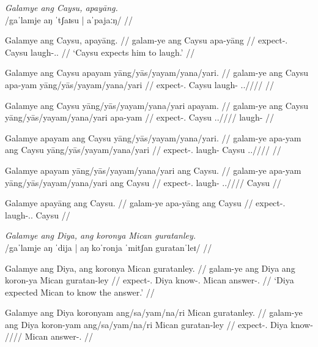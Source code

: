 \documentclass[12pt,a4paper]{scrartcl}
\newcommand{\PargI}{{\Parg}.{\Inan}}
\newcommand{\TsgM}{{\Tsg}.{\M}}
\newcommand{\TsgF}{{\Tsg}.{\F}}
\begin{document}
\xe

\pex
\a\begingl
\glpreamble \textit{Galamye ang Caysu, apayāng.} \\
	/gaˈlamje aŋ ˈtʃaɪsu | aˈpajaːŋ/ //

\gla Galamye ang Caysu, apayāng. //
\glb galam-ye ang Caysu apa-yāng //
\glc expect-\TsgF{} \Aarg{} Caysu laugh-\TsgM{}.\Aarg{} //
\glft `Caysu expects him to laugh.' //
\endgl

\a\ljudge*\begingl
\gla Galamye ang Caysu apayam yāng/yās/yayam/yana/yari. //
\glb galam-ye ang Caysu apa-yam yāng/yās/yayam/yana/yari //
\glc expect-\TsgF{} \Aarg{} Caysu laugh-\Ptcp{} \TsgM{}.\Aarg{}/\Parg{}/\Dat{}/\Gen{}/\Ins{} //
\endgl

\a\ljudge*\begingl
\gla Galamye ang Caysu yāng/yās/yayam/yana/yari apayam. //
\glb galam-ye ang Caysu yāng/yās/yayam/yana/yari apa-yam //
\glc expect-\TsgF{} \Aarg{} Caysu \TsgM{}.\Aarg{}/\Parg{}/\Dat{}/\Gen{}/\Ins{} laugh-\Ptcp{} //
\endgl

\a\ljudge*\begingl
\gla Galamye apayam ang Caysu yāng/yās/yayam/yana/yari. //
\glb galam-ye apa-yam ang Caysu yāng/yās/yayam/yana/yari //
\glc expect-\TsgF{} laugh-\Ptcp{} \Aarg{} Caysu \TsgM{}.\Aarg{}/\Parg{}/\Dat{}/\Gen{}/\Ins{} //
\endgl

\a\ljudge*\begingl
\gla Galamye apayam yāng/yās/yayam/yana/yari ang Caysu. //
\glb galam-ye apa-yam yāng/yās/yayam/yana/yari ang Caysu //
\glc expect-\TsgF{} laugh-\Ptcp{} \TsgM{}.\Aarg{}/\Parg{}/\Dat{}/\Gen{}/\Ins{} \Aarg{} Caysu //
\endgl

\a\ljudge*\begingl
\gla Galamye apayāng ang Caysu. //
\glb galam-ye apa-yāng ang Caysu //
\glc expect-\TsgF{} laugh-\TsgM{}.\Aarg{} \Aarg{} Caysu //
\endgl

\xe

\pex
\a\begingl
\glpreamble \textit{Galamye ang Diya, ang koronya Mican guratanley.} \\
	/gaˈlamje aŋ ˈdija | aŋ koˈronja ˈmitʃan guratanˈleɪ/ //

\gla Galamye ang Diya, ang koronya Mican guratanley. //
\glb galam-ye ang Diya ang koron-ya Mican guratan-ley //
\glc expect-\TsgF{} \Aarg{} Diya \AgtT{} know-\TsgM{} Mican answer-\PargI{} //
\glft `Diya expected Mican to know the answer.' //
\endgl

\a\ljudge*\begingl
\gla Galamye ang Diya koronyam ang/sa/yam/na/ri Mican guratanley. //
\glb galam-ye ang Diya koron-yam ang/sa/yam/na/ri Mican guratan-ley //
\glc expect-\TsgF{} \Aarg{} Diya know-\Ptcp{} \Aarg{}/\Parg{}/\Dat{}/\Gen{}/\Ins{} Mican answer-\PargI{} //
\endgl
\end{document}
